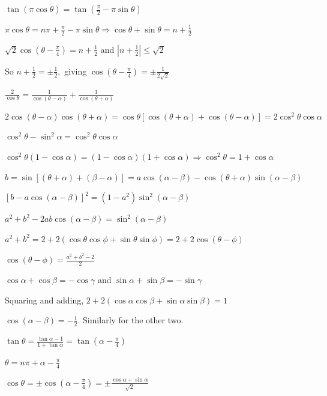 \item $\tan(\pi\cos\theta) = \tan\left(\frac{\pi}{2} - \pi\sin\theta\right)$

  $\pi\cos\theta = n\pi + \frac{\pi}{2} - \pi\sin\theta \Rightarrow \cos\theta + \sin\theta = n + \frac{1}{2}$

  $\sqrt{2}\cos\left(\theta - \frac{\pi}{4}\right) = n + \frac{1}{2}$ and $\left|n + \frac{1}{2}\right| \leq \sqrt{2}$

  So $n + \frac{1}{2} = \pm\frac{1}{2},$ giving $\cos\left(\theta - \frac{\pi}{4}\right) = \pm\frac{1}{2\sqrt{2}}$

\item $\frac{2}{\cos\theta} = \frac{1}{\cos(\theta - \alpha)} + \frac{1}{\cos(\theta + \alpha)}$

  $2\cos(\theta - \alpha)\cos(\theta + \alpha) = \cos\theta[\cos(\theta + \alpha) + \cos(\theta - \alpha)] =
  2\cos^2\theta\cos\alpha$

  $\cos^2\theta - \sin^2\alpha = \cos^2\theta\cos\alpha$

  $\cos^2\theta(1 - \cos\alpha) = (1 - \cos\alpha)(1 + \cos\alpha) \Rightarrow \cos^2\theta = 1 + \cos\alpha$

\item $b = \sin[(\theta + \alpha) + (\beta - \alpha)] = a\cos(\alpha - \beta) - \cos(\theta + \alpha)\sin(\alpha -
  \beta)$

  $[b - a\cos(\alpha - \beta)]^2 = (1 - a^2)\sin^2(\alpha - \beta)$

  $a^2 + b^2 - 2ab\cos(\alpha - \beta) = \sin^2(\alpha - \beta)$

\item $a^2 + b^2 = 2 + 2(\cos\theta\cos\phi + \sin\theta\sin\phi) = 2 + 2\cos(\theta - \phi)$

  $\cos(\theta - \phi) = \frac{a^2 + b^2 - 2}{2}$

\item $\cos\alpha + \cos\beta = -\cos\gamma$ and $\sin\alpha + \sin\beta = -\sin\gamma$

  Squaring and adding, $2 + 2(\cos\alpha\cos\beta + \sin\alpha\sin\beta) = 1$

  $\cos(\alpha - \beta) = -\frac{1}{2}.$ Similarly for the other two.

\item $\tan\theta = \frac{\tan\alpha - 1}{1 + \tan\alpha} = \tan\left(\alpha - \frac{\pi}{4}\right)$

  $\theta = n\pi + \alpha - \frac{\pi}{4}$

  $\cos\theta = \pm\cos\left(\alpha - \frac{\pi}{4}\right) = \pm\frac{\cos\alpha + \sin\alpha}{\sqrt{2}}$

